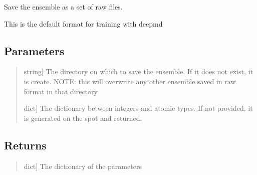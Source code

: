 \documentclass[a4paper,11pt,english]{sphinxmanual}
\begin{document}
\begin{fulllineitems}
\begin{fulllineitems}
\begin{quote}
\begin{description}
\end{description}
\end{quote}

\end{fulllineitems}


\begin{fulllineitems}
\label{\detokenize{apireference:sscha.Ensemble.Ensemble.save_raw}}
\pysigstartsignatures
{}
\pysigstopsignatures
\sphinxAtStartPar
Save the ensemble as a set of raw files.

\sphinxAtStartPar
This is the default format for training with deepmd


\subsection{Parameters}
\label{\detokenize{apireference:id25}}\begin{quote}
\begin{description}
\sphinxlineitem{filename}{[}string{]}
\sphinxAtStartPar
The directory on which to save the ensemble. If it does not exist, it is create.
NOTE: this will overwrite any other ensemble saved in raw format in that directory

\sphinxlineitem{type\_dict}{[}dict{]}
\sphinxAtStartPar
The dictionary between integers and atomic types. If not provided, it is generated on the spot and returned.

\end{description}
\end{quote}


\subsection{Returns}
\label{\detokenize{apireference:id26}}\begin{quote}
\begin{description}
\sphinxlineitem{type\_dict}{[}dict{]}
\sphinxAtStartPar
The dictionary of the parameters

\end{description}
\end{quote}

\end{fulllineitems}


\end{fulllineitems}
\end{document}
